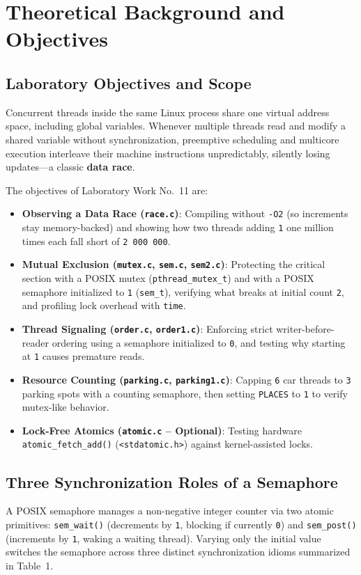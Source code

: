 \documentclass[12pt,a4paper]{article}
\begin{document}
\section{Theoretical Background and Objectives}

\subsection{Laboratory Objectives and Scope}
Concurrent threads inside the same Linux process share one virtual address space, including global variables. Whenever multiple threads read and modify a shared variable without synchronization, preemptive scheduling and multicore execution interleave their machine instructions unpredictably, silently losing updates---a classic \textbf{data race}.

The objectives of Laboratory Work No.~11 are:
\begin{itemize}
    \item \textbf{Observing a Data Race (\texttt{race.c})}: Compiling without \texttt{-O2} (so increments stay memory-backed) and showing how two threads adding \texttt{1} one million times each fall short of \texttt{2\,000\,000}.
    \item \textbf{Mutual Exclusion (\texttt{mutex.c}, \texttt{sem.c}, \texttt{sem2.c})}: Protecting the critical section with a POSIX mutex (\texttt{pthread\_mutex\_t}) and with a POSIX semaphore initialized to \texttt{1} (\texttt{sem\_t}), verifying what breaks at initial count \texttt{2}, and profiling lock overhead with \texttt{time}.
    \item \textbf{Thread Signaling (\texttt{order.c}, \texttt{order1.c})}: Enforcing strict writer-before-reader ordering using a semaphore initialized to \texttt{0}, and testing why starting at \texttt{1} causes premature reads.
    \item \textbf{Resource Counting (\texttt{parking.c}, \texttt{parking1.c})}: Capping \texttt{6} car threads to \texttt{3} parking spots with a counting semaphore, then setting \texttt{PLACES} to \texttt{1} to verify mutex-like behavior.
    \item \textbf{Lock-Free Atomics (\texttt{atomic.c} -- Optional)}: Testing hardware \texttt{atomic\_\allowbreak fetch\_\allowbreak add()} (\texttt{<stdatomic.\allowbreak h>}) against kernel-assisted locks.
\end{itemize}

\subsection{Three Synchronization Roles of a Semaphore}
A POSIX semaphore manages a non-negative integer counter via two atomic primitives: \texttt{sem\_wait()} (decrements by \texttt{1}, blocking if currently \texttt{0}) and \texttt{sem\_post()} (increments by \texttt{1}, waking a waiting thread). Varying only the initial value switches the semaphore across three distinct synchronization idioms summarized in Table~1.
\end{document}
